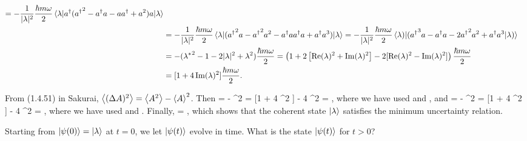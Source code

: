 \begin{solution}
\begin{align}
		= -\frac{1}{|\lam|^2} \frac{\hbar m \omega}{2} \ev{\ad ({\ad}^2 - \ad a - a \ad + a^2) a}{\lam} \notag \\
		&= -\frac{1}{|\lam|^2} \frac{\hbar m \omega}{2} \ev{({\ad}^2 a - {\ad}^2 a^2 - \ad a \ad a + \ad a^3)}{\lam}
		= -\frac{1}{|\lam|^2} \frac{\hbar m \omega}{2} \ev{({\ad}^3 a - \ad a - 2 {\ad}^2 a^2 + \ad a^3}{\lam)} \notag \\
		&= -({\lam^*}^2 - 1 - 2 |\lam|^2 + \lam^2) \frac{\hbar m \omega}{2}
		= \left( 1 + 2 \left[ \Rel^2 + \Iml^2 \right] - 2 [\Rel^2 - \Iml^2] 
\right) \frac{\hbar m \omega}{2} \notag \\
		&= [1 + 4 \Iml^2] \frac{\hbar m \omega}{2}. \label{evPsq}
	\end{align}
	
	From (1.4.51) in Sakurai, $\ev{(\DA)^2} = \ev{A^2} - \ev{A}^2$.  Then
	\beq
		 =  - ^2 = [1 + 4 \Rel^2 ]  - 4 \Rel^2  = ,
	\eeq
	where we have used  and , and
	\beq
		 =  - ^2 = [1 + 4 \Iml^2 ]  - 4 \Iml^2  = ,
	\eeq
	where we have used  and .  Finally,
	\beq
		  = ,
	\eeq
	which shows that the coherent state $\ket{\lambda}$ satisfies the minimum uncertainty relation.
\end{solution}


\newcommand{\psit}{\psi(t)}
\newcommand{\kpsit}{\ket{\psit}}
\newcommand{\Ut}{U(t)}

\newcommand{\eiwt}{e^{i \omega t}}
\newcommand{\emiwt}{e^{-i \omega t}}

\newcommand{\eiwtf}{e^{i \omega t / 2}}
\newcommand{\emiwtf}{e^{-i \omega t / 2}}

\newcommand{\lamt}{\lam \emiwt}
\newcommand{\klamt}{\ket{\lamt}}
\newcommand{\blamt}{\bra{\lamt}}

\begin{problem}
	Starting from $\ket{\psi(0)} = \ket{\lambda}$ at $t = 0$, we let $\kpsit$ evolve in time.  What is the state $\kpsit$ for $t > 0$?
\end{problem}

